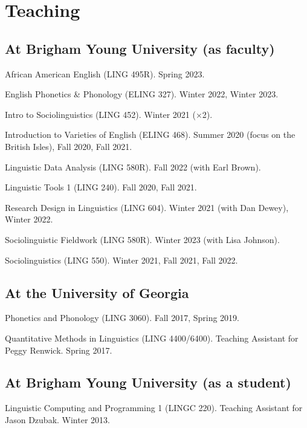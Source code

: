\documentclass[
]{article}
\begin{document}
\hypertarget{teaching}{%
\section{Teaching}\label{teaching}}

\hypertarget{at-brigham-young-university-as-faculty}{%
\subsection{At Brigham Young University (as
faculty)}\label{at-brigham-young-university-as-faculty}}

African American English (LING 495R). Spring 2023.

English Phonetics \& Phonology (ELING 327). Winter 2022, Winter 2023.

Intro to Sociolinguistics (LING 452). Winter 2021 (×2).

Introduction to Varieties of English (ELING 468). Summer 2020 (focus on
the British Isles), Fall 2020, Fall 2021.

Linguistic Data Analysis (LING 580R). Fall 2022 (with Earl Brown).

Linguistic Tools 1 (LING 240). Fall 2020, Fall 2021.

Research Design in Linguistics (LING 604). Winter 2021 (with Dan Dewey),
Winter 2022.

Sociolinguistic Fieldwork (LING 580R). Winter 2023 (with Lisa Johnson).

Sociolinguistics (LING 550). Winter 2021, Fall 2021, Fall 2022.

\hypertarget{at-the-university-of-georgia}{%
\subsection{At the University of
Georgia}\label{at-the-university-of-georgia}}

Phonetics and Phonology (LING 3060). Fall 2017, Spring 2019.

Quantitative Methods in Linguistics (LING 4400/6400). Teaching Assistant
for Peggy Renwick. Spring 2017.

\hypertarget{at-brigham-young-university-as-a-student}{%
\subsection{At Brigham Young University (as a
student)}\label{at-brigham-young-university-as-a-student}}

Linguistic Computing and Programming 1 (LINGC 220). Teaching Assistant
for Jason Dzubak. Winter 2013.
\end{document}
